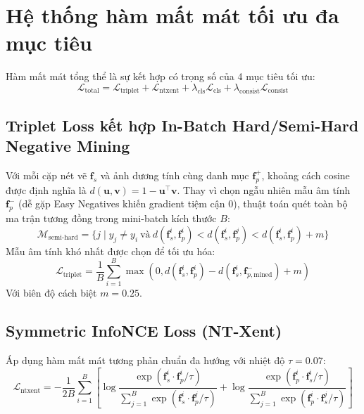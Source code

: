 \documentclass[12pt,a4paper]{report}
\begin{document}
\section{Hệ thống hàm mất mát tối ưu đa mục tiêu}
Hàm mất mát tổng thể là sự kết hợp có trọng số của 4 mục tiêu tối ưu:
\begin{equation}
    \mathcal{L}_{\text{total}} = \mathcal{L}_{\text{triplet}} + \mathcal{L}_{\text{ntxent}} + \lambda_{\text{cls}} \mathcal{L}_{\text{cls}} + \lambda_{\text{consist}} \mathcal{L}_{\text{consist}}
\end{equation}

\subsection{Triplet Loss kết hợp In-Batch Hard/Semi-Hard Negative Mining}
Với mỗi cặp nét vẽ $\mathbf{f}_s$ và ảnh dương tính cùng danh mục $\mathbf{f}_{p}^{+}$, khoảng cách cosine được định nghĩa là $d(\mathbf{u}, \mathbf{v}) = 1 - \mathbf{u}^\top \mathbf{v}$. Thay vì chọn ngẫu nhiên mẫu âm tính $\mathbf{f}_{p}^{-}$ (dễ gặp Easy Negatives khiến gradient tiệm cận 0), thuật toán quét toàn bộ ma trận tương đồng trong mini-batch kích thước $B$:
\begin{equation}
    \mathcal{M}_{\text{semi-hard}} = \{ j \mid y_j \neq y_i \ \text{và}\ d(\mathbf{f}_s^i, \mathbf{f}_p^i) < d(\mathbf{f}_s^i, \mathbf{f}_p^j) < d(\mathbf{f}_s^i, \mathbf{f}_p^i) + m \}
\end{equation}
Mẫu âm tính khó nhất được chọn để tối ưu hóa:
\begin{equation}
    \mathcal{L}_{\text{triplet}} = \frac{1}{B} \sum_{i=1}^{B} \max\left( 0, d(\mathbf{f}_s^i, \mathbf{f}_p^i) - d(\mathbf{f}_s^i, \mathbf{f}_{p, \text{mined}}^{-}) + m \right)
\end{equation}
Với biên độ cách biệt $m = 0.25$.

\subsection{Symmetric InfoNCE Loss (NT-Xent)}
Áp dụng hàm mất mát tương phản chuẩn đa hướng với nhiệt độ $\tau = 0.07$:
\begin{equation}
    \mathcal{L}_{\text{ntxent}} = -\frac{1}{2B} \sum_{i=1}^{B} \left[ \log \frac{\exp(\mathbf{f}_s^i \cdot \mathbf{f}_p^i / \tau)}{\sum_{j=1}^B \exp(\mathbf{f}_s^i \cdot \mathbf{f}_p^j / \tau)} + \log \frac{\exp(\mathbf{f}_p^i \cdot \mathbf{f}_s^i / \tau)}{\sum_{j=1}^B \exp(\mathbf{f}_p^i \cdot \mathbf{f}_s^j / \tau)} \right]
\end{equation}
\end{document}
